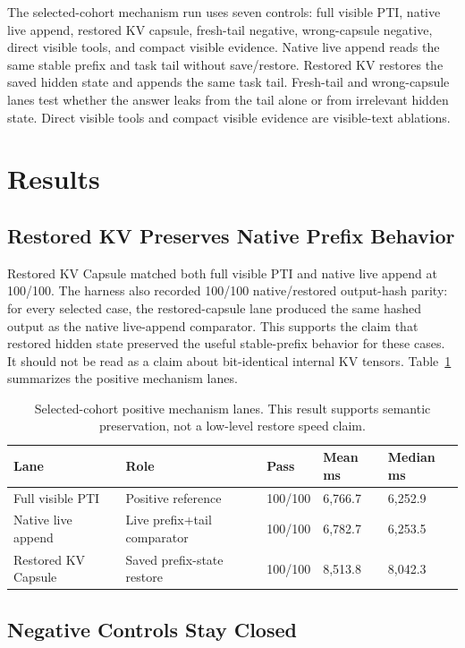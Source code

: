 \documentclass[11pt]{article}
\begin{document}
The selected-cohort mechanism run uses seven controls: full visible PTI, native live append, restored KV capsule, fresh-tail negative, wrong-capsule negative, direct visible tools, and compact visible evidence. Native live append reads the same stable prefix and task tail without save/restore. Restored KV restores the saved hidden state and appends the same task tail. Fresh-tail and wrong-capsule lanes test whether the answer leaks from the tail alone or from irrelevant hidden state. Direct visible tools and compact visible evidence are visible-text ablations.

\section{Results}

\subsection{Restored KV Preserves Native Prefix Behavior}

Restored KV Capsule matched both full visible PTI and native live append at 100/100. The harness also recorded 100/100 native/restored output-hash parity: for every selected case, the restored-capsule lane produced the same hashed output as the native live-append comparator. This supports the claim that restored hidden state preserved the useful stable-prefix behavior for these cases. It should not be read as a claim about bit-identical internal KV tensors. Table~\ref{tab:mechanism} summarizes the positive mechanism lanes.

\begin{table}[h]
\centering
\begin{tabular}{lllll}
\toprule
Lane & Role & Pass & Mean ms & Median ms \\
\midrule
Full visible PTI & Positive reference & 100/100 & 6,766.7 & 6,252.9 \\
Native live append & Live prefix+tail comparator & 100/100 & 6,782.7 & 6,253.5 \\
Restored KV Capsule & Saved prefix-state restore & 100/100 & 8,513.8 & 8,042.3 \\
\bottomrule
\end{tabular}
\caption{Selected-cohort positive mechanism lanes. This result supports semantic preservation, not a low-level restore speed claim.}
\label{tab:mechanism}
\end{table}

\subsection{Negative Controls Stay Closed}
\end{document}
